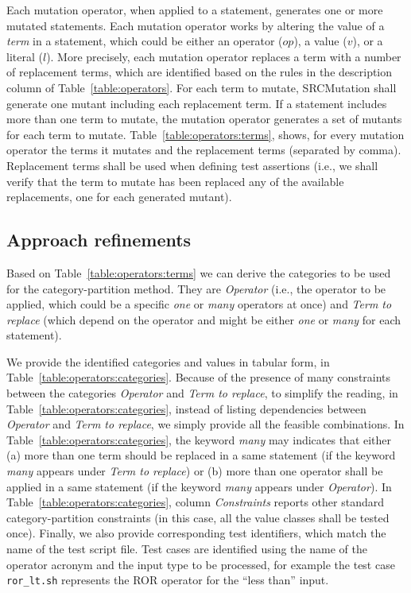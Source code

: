 Each mutation operator, when applied to a statement, generates one or more mutated statements.
Each mutation operator works by altering the value of a \emph{term} in a statement, which could be either an operator  ($op$), a value ($v$), or a literal ($l$). More precisely, each mutation operator replaces a term with a number of replacement terms, which are identified based on the rules in the description column of Table~\ref{table:operators}.
For each term to mutate, SRCMutation shall generate one mutant including each replacement term.
If a statement includes more than one term to mutate, the mutation operator generates a set of mutants for each term to mutate. Table~\ref{table:operators:terms}, shows, for every mutation operator the terms it mutates and the replacement terms (separated by comma). Replacement terms shall be used when defining test assertions (i.e., we shall verify that the term to mutate has been replaced any of the available replacements, one for each generated mutant).




\subsection{Approach refinements}

Based on Table~\ref{table:operators:terms} we can derive the categories to be used for the category-partition method. 
They are \emph{Operator} (i.e., the operator to be applied, which could be a specific \emph{one} or \emph{many} operators at once) and \emph{Term to replace} (which depend on the operator and might be either \emph{one} or \emph{many} for each statement).

We provide the identified categories and values in tabular form, in Table~\ref{table:operators:categories}. 
Because of the presence of many constraints between the categories \emph{Operator} and \emph{Term to replace}, 
to simplify the reading, in Table~\ref{table:operators:categories}, instead of listing dependencies between \emph{Operator} and \emph{Term to replace}, we simply provide all the feasible combinations.
In Table~\ref{table:operators:categories}, the keyword \emph{many} may indicates that either (a) more than one term should be replaced in a same statement (if the keyword \emph{many} appears under \emph{Term to replace}) or (b) more than one operator shall be applied in a same statement (if the keyword \emph{many} appears under \emph{Operator}).
In Table~\ref{table:operators:categories}, column \emph{Constraints} reports other standard category-partition constraints (in this case, all the value classes shall be tested once).
Finally, we also provide corresponding test identifiers, which match the name of the test script file. Test cases are identified using the name of the operator acronym and the input type to be processed, for example the test case \texttt{ror\_lt.sh} represents the ROR operator for the ``less than'' input.





